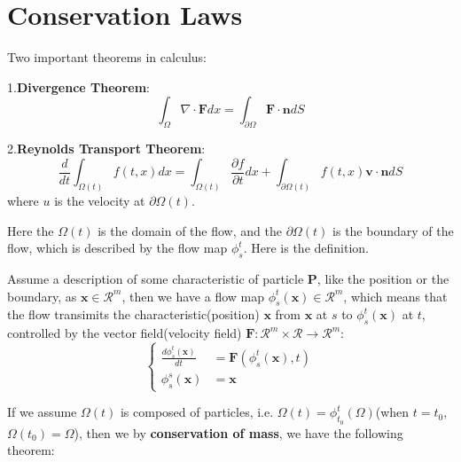 \newpage
\appendix

\section{Conservation Laws}
\begin{theorem}Two important theorems in calculus:

    1.\textbf{Divergence Theorem}:
    \begin{equation}
        \int_{\Omega} \nabla \cdot \mathbf{F} d x = \int_{\partial \Omega} \mathbf{F} \cdot \mathbf{n} d S
    \end{equation}

    2.\textbf{Reynolds Transport Theorem}:
    \begin{equation}
        \frac{d}{dt}\int_{\Omega(t)} f(t, x) d x = \int_{\Omega (t)} \frac{\partial f}{\partial t} d x + \int_{\partial \Omega (t)} f(t, x) \mathbf{v} \cdot \mathbf{n} d S
    \end{equation}
    where $u$ is the velocity at $\partial \Omega (t)$.
\end{theorem}
Here the $\Omega(t)$ is the domain of the flow, and the $\partial \Omega(t)$ is the boundary of the flow, which is described by the flow map $\phi_s^t$. Here is the definition.
\begin{definition}
    Assume a description of some characteristic of particle $\mathbf{P}$, like the position or the boundary, as $\mathbf{x}\in \mathcal{R}^m$, then we have a flow map $\phi_s^t(\mathbf{x})\in \mathcal{R}^m$, 
    which means that the flow transimits the characteristic(position) $\mathbf{x}$ from $\mathbf{x}$ at $s$ to $\phi_s^t(\mathbf{x})$ at $t$, controlled by the vector field(velocity field) $\mathbf{F}: \mathcal{R}^m\times \mathcal{R}\to \mathcal{R}^m$:
    \begin{equation}\left\{
        \begin{aligned}
            \frac{d\phi_s^t(\mathbf{x})}{dt} &= \mathbf{F}(\phi_s^t(\mathbf{x}), t)\\
            \phi_s^s(\mathbf{x}) &= \mathbf{x}
        \end{aligned}\right.
    \end{equation}
\end{definition}
If we assume $\Omega(t)$ is composed of particles, i.e. $\Omega(t)=\phi_{t_0}^t(\Omega)$(when $t = t_0$, $\Omega(t_0)=\Omega$), 
then we by \textbf{conservation of mass}, we have the following theorem:
